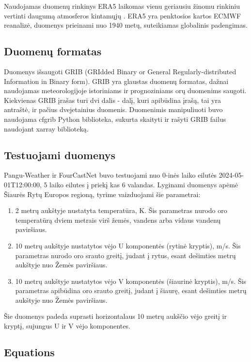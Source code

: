 \documentclass[conference]{IEEEtran}
\begin{document}
Naudojamas duomenų rinkinys ERA5 \cite{data} laikomas vienu geriausiu žinomu rinkiniu vertinti daugumą atmosferos kintamųjų \cite{evaluationoftheERA5}. ERA5 yra penktosios kartos ECMWF reanalizė, duomenys prieinami nuo 1940 metų, suteikiamas globalinis padengimas. 

\subsection{Duomenų formatas}
Duomenys išsaugoti GRIB (GRIdded Binary or General Regularly-distributed Information in Binary form). GRIB yra glaustas duomenų formatas, dažnai naudojamas meteorologijoje istoriniams ir prognoziniams orų duomenims saugoti. Kiekvienas GRIB įrašas turi dvi dalis - dalį, kuri apibūdina įrašą, tai yra antraštė, ir pačius dvejetainius duomenis. Duomenimis manipuliuoti buvo naudojama cfgrib Python biblioteka, sukurta skaityti ir rašyti GRIB failus naudojant xarray biblioteką.   

\subsection{Testuojami duomenys}
Pangu-Weather \cite{bi2023accurate} ir FourCastNet \cite{pathak2022fourcastnet} buvo testuojami nuo 0-inės laiko eilutės 2024-05-01T12:00:00, 5 laiko eilutes į priekį kas 6 valandas. Lyginami duomenys apėmė Šiaurės Rytų Europos regioną, tyrime vaizduojami šie parametrai:
\begin{enumerate}
\item 2 metrų aukštyje nustatyta temperatūra, K. Šis parametras nurodo oro temperatūrą dviem metrais virš žemės, vandens arba vidaus vandenų paviršiaus.
\item 10 metrų aukštyje nustatytos vėjo U komponentės (rytinė kryptis), m/s. Šis parametras nurodo oro srauto greitį, judant į rytus, esant dešimties metrų aukštyje nuo Žemės paviršiaus.
\item 10 metrų aukštyje nustatytos vėjo V komponentės (šiaurinė kryptis), m/s. Šis parametras apibūdina oro srauto greitį, judant į šiaurę, esant dešimties metrų aukštyje nuo Žemės paviršiaus. 
\end{enumerate}
Šie duomenys padeda suprasti horizontalaus 10 metrų aukščio vėjo greitį ir kryptį, sujungus U ir V vėjo komponentes.

\subsection{Equations}
\end{document}
